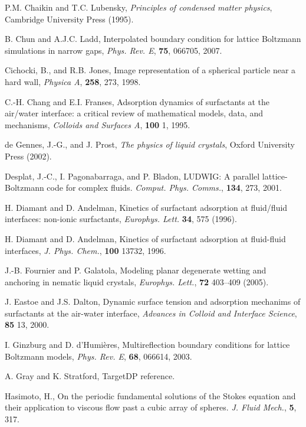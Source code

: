 \begin{thebibliography}{99}
P.M. Chaikin and T.C. Lubensky,
\textit{Principles of condensed matter physics}, Cambridge University
Press (1995).

B. Chun and A.J.C. Ladd,
Interpolated boundary condition for lattice Boltzmann simulations in
narrow gaps,
\textit{Phys. Rev. E}, \textbf{75}, 066705, 2007.

Cichocki, B., and R.B. Jones,
Image representation of a spherical particle near a hard wall,
\textit{Physica A}, \textbf{258}, 273, 1998.

C.-H. Chang and E.I. Franses,
Adsorption dynamics of surfactants at the air/water interface:
a critical review of mathematical models, data, and mechanisms,
\textit{Colloids and Surfaces A}, \textbf{100} 1, 1995.

de Gennes, J.-G., and J. Prost,
\textit{The physics of liquid crystals},
Oxford University Press (2002).

Desplat, J.-C., I. Pagonabarraga, and P. Bladon,
LUDWIG: A parallel lattice-Boltzmann code for complex fluids.
\textit{Comput. Phys. Comms.}, \textbf{134}, 273, 2001.

H. Diamant and D. Andelman,
Kinetics of surfactant adsorption at fluid/fluid
interfaces: non-ionic surfactants,
\textit{Europhys. Lett.} \textbf{34}, 575 (1996).

H. Diamant and D. Andelman,
Kinetics of surfactant adsorption at fluid-fluid interfaces,
\textit{J. Phys. Chem.}, \textbf{100} 13732, 1996.

J.-B. Fournier and P. Galatola,
Modeling planar degenerate wetting and anchoring in nematic liquid
crystals,
\textit{Europhys. Lett.}, \textbf{72} 403--409 (2005).

J. Eastoe and J.S. Dalton,
Dynamic surface tension and adsorption mechanims of surfactants
at the air-water interface,
\textit{Advances in Colloid and Interface Science}, \textbf{85}
13, 2000.

I. Ginzburg and D. d'Humi\`eres,
Multireflection boundary conditions for lattice Boltzmann models,
\textit{Phys. Rev. E}, \textbf{68}, 066614, 2003.

A. Gray and K. Stratford,
TargetDP reference.

Hasimoto, H., On the periodic fundamental solutions of the Stokes
equation and their application to viscous flow past a cubic array
of spheres.
\textit{J. Fluid Mech.}, \textbf{5}, 317.


\end{thebibliography}
